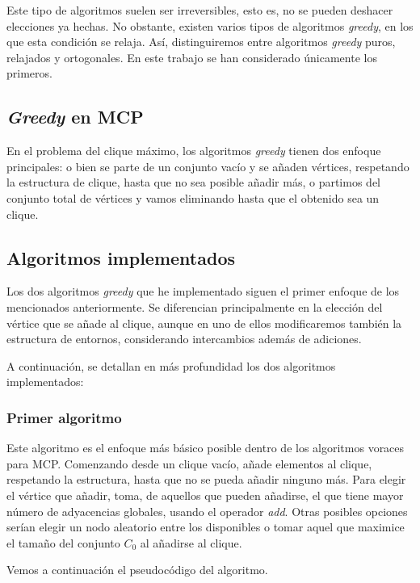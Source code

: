 Este tipo de algoritmos suelen ser irreversibles, esto es, no se pueden deshacer elecciones ya hechas.
No obstante, existen varios tipos de algoritmos \textit{greedy}, en los que esta condición se relaja. Así,
distinguiremos entre algoritmos \textit{greedy} puros, relajados y ortogonales. En este trabajo se han
considerado únicamente los primeros.

\subsection{\textit{Greedy} en MCP}

En el problema del clique máximo, los algoritmos \textit{greedy} tienen dos enfoque principales:
o bien se parte de un conjunto vacío y se añaden vértices, respetando la estructura de clique,
hasta que no sea posible añadir más, o partimos del conjunto total de vértices y vamos eliminando
hasta que el obtenido sea un clique.

\subsection{Algoritmos implementados}

Los dos algoritmos \textit{greedy} que he implementado siguen el primer enfoque de los mencionados anteriormente.
Se diferencian principalmente en la elección del vértice que se añade al clique, aunque en uno de ellos modificaremos
también la estructura de entornos, considerando intercambios además de adiciones.

A continuación, se detallan en más profundidad los dos algoritmos implementados:

\subsubsection{Primer algoritmo}

Este algoritmo es el enfoque más básico posible dentro de los algoritmos voraces para MCP.
Comenzando desde un clique vacío, añade elementos al clique, respetando la estructura, hasta
que no se pueda añadir ninguno más. Para elegir el vértice que añadir, toma, de aquellos que
pueden añadirse, el que tiene mayor número de adyacencias globales, usando el operador \textit{add}.
Otras posibles opciones serían elegir un nodo aleatorio entre los disponibles o tomar aquel que
maximice el tamaño del conjunto $C_0$ al añadirse al clique.

Vemos a continuación el pseudocódigo del algoritmo.

